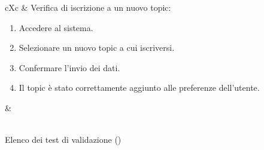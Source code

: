 \begin{table}[H]
\begin{VTtable}[1.7]{\textwidth}{cXc}
        \addtotv & Verifica di iscrizione a un nuovo topic:
		\begin{enumerate}
			\item Accedere al sistema.
            \item Selezionare un nuovo topic a cui iscriversi.
            \item Confermare l'invio dei dati.
            \item Il topic è stato correttamente aggiunto alle preferenze dell'utente.
		\end{enumerate}
		& \TNI \\
        \bottomrule\\
	\end{VTtable}
	\caption{Elenco dei test di validazione (\thetableCounter)}
\end{table}

